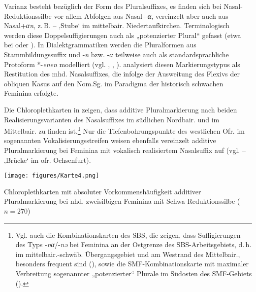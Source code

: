 Varianz besteht bezüglich der Form des Pluralsuffixes, es finden sich bei Nasal-Reduktionssilbe vor allem Abfolgen aus Nasal+\textit{α}, vereinzelt aber auch aus Nasal+\textit{αn}, z.\,B.  --  ‚Stube‘ im mittelbair. Niedertaufkirchen. Terminologisch werden diese Doppelsuffigierungen auch als „potenzierter Plural“ gefasst (etwa bei \citealt[431]{Schirmunski1962} oder \citealt[192]{Zehetner1978}). In Dialektgrammatiken werden die Pluralformen aus Stammbildungssuffix und -\textit{n} bzw. -\textit{α} teilweise auch als standardsprachliche Protoform *-\textit{enen} modelliert (vgl. \citealt[§863]{Schmeller1821}, \citealt[187]{Wildfeuer2001}, \citealt[117]{Zehetner1985}). \citet{Mauser1998a, Mauser1998b} analysiert diesen Markierungstypus als Restitution des mhd. Nasalsuffixes, die infolge der Ausweitung des Flexivs der obliquen Kasus auf den Nom.Sg. im Paradigma der historisch schwachen Feminina erfolgte.

\begin{sloppypar}
Die Chloroplethkarten in  zeigen, dass additive Pluralmarkierung nach beiden Realisierungsvarianten des Nasalsuffixes im südlichen Nordbair. und im Mittelbair. zu finden ist.\footnote{Vgl. auch die Kombinationskarten des SBS, die zeigen, dass Suffigierungen des Typs -\textit{nα}/-\textit{nə} bei Feminina an der Ostgrenze des SBS-Arbeitsgebiets, d.\,h. im mittelbair.-schwäb. Übergangsgebiet und am Westrand des Mittelbair., besonders frequent sind (\citealt[Karte 117, 122, 131]{SBS9.1}), sowie die SMF-Kombinationskarte mit maximaler Verbreitung sogenannter „potenzierter“ Plurale im Südosten des SMF-Gebiets (\citealt[Karte 1]{SMF7}).} Nur die Tiefenbohrungspunkte des westlichen Ofr. im sogenannten Vokalisierungsstreifen weisen ebenfalls vereinzelt additive Pluralmarkierung bei Feminina mit vokalisch realisiertem Nasalsuffix auf (vgl.  --  ‚Brücke‘ im ofr. Ochsenfurt).
\end{sloppypar}


\begin{map}
\texttt{[image: figures/Karte4.png]}
\caption{Chloroplethkarten mit absoluter Vorkommenshäufigkeit additiver Pluralmarkierung bei nhd. zweisilbigen Feminina mit Schwa-Reduktionssilbe ($n=270$)}
\label{map:4}
\end{map}

